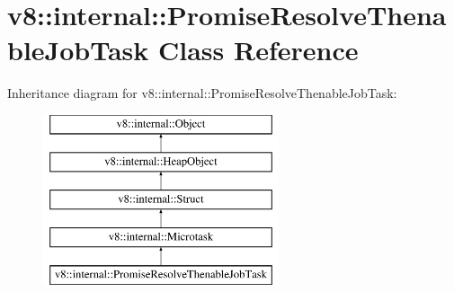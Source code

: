\hypertarget{classv8_1_1internal_1_1PromiseResolveThenableJobTask}{}\section{v8\+:\+:internal\+:\+:Promise\+Resolve\+Thenable\+Job\+Task Class Reference}
\label{classv8_1_1internal_1_1PromiseResolveThenableJobTask}
Inheritance diagram for v8\+:\+:internal\+:\+:Promise\+Resolve\+Thenable\+Job\+Task\+:\begin{figure}[H]
\begin{center}
\leavevmode
\includegraphics[height=5.000000cm]{classv8_1_1internal_1_1PromiseResolveThenableJobTask}
\end{center}
\end{figure}
